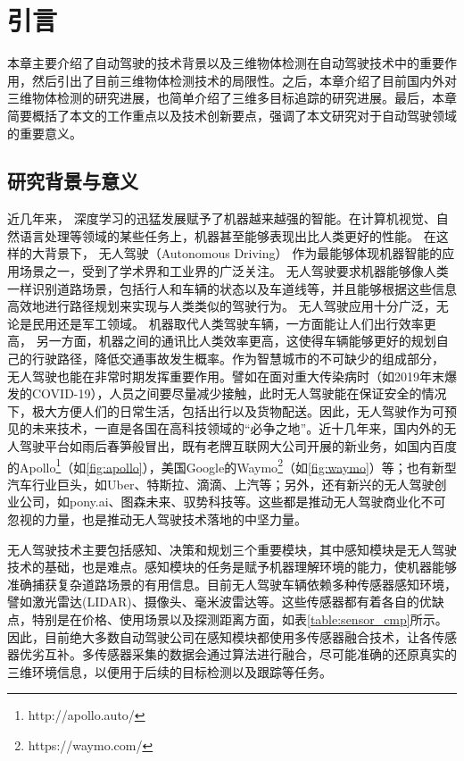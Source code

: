 \chapter{引言}
\label{ch:intro}
本章主要介绍了自动驾驶的技术背景以及三维物体检测在自动驾驶技术中的重要作用，然后引出了目前三维物体检测技术的局限性。之后，本章介绍了目前国内外对三维物体检测的研究进展，也简单介绍了三维多目标追踪的研究进展。最后，本章简要概括了本文的工作重点以及技术创新要点，强调了本文研究对于自动驾驶领域的重要意义。

\section{研究背景与意义}
\label{sec:background}
近几年来， 深度学习的迅猛发展赋予了机器越来越强的智能。在计算机视觉、自然语言处理等领域的某些任务上，机器甚至能够表现出比人类更好的性能\cite{he2016deep,DevlinBERT}。 在这样的大背景下， 无人驾驶（Autonomous Driving） 作为最能够体现机器智能的应用场景之一，受到了学术界和工业界的广泛关注。 无人驾驶要求机器能够像人类一样识别道路场景，包括行人和车辆的状态以及车道线等，并且能够根据这些信息高效地进行路径规划来实现与人类类似的驾驶行为。 无人驾驶应用十分广泛，无论是民用还是军工领域。 机器取代人类驾驶车辆，一方面能让人们出行效率更高， 另一方面，机器之间的通讯比人类效率更高，这使得车辆能够更好的规划自己的行驶路径，降低交通事故发生概率。作为智慧城市的不可缺少的组成部分， 无人驾驶也能在非常时期发挥重要作用。譬如在面对重大传染病时（如2019年末爆发的COVID-19），人员之间要尽量减少接触，此时无人驾驶能在保证安全的情况下，极大方便人们的日常生活，包括出行以及货物配送。因此，无人驾驶作为可预见的未来技术，一直是各国在高科技领域的“必争之地”。近十几年来，国内外的无人驾驶平台如雨后春笋般冒出，既有老牌互联网大公司开展的新业务，如国内百度的Apollo\footnote[1]{http://apollo.auto/}（如\figurename \ref{fig:apollo}），美国Google的Waymo\footnote[2]{https://waymo.com/}（如\figurename \ref{fig:waymo}）等；也有新型汽车行业巨头，如Uber、特斯拉、滴滴、上汽等；另外，还有新兴的无人驾驶创业公司，如pony.ai、图森未来、驭势科技等。这些都是推动无人驾驶商业化不可忽视的力量，也是推动无人驾驶技术落地的中坚力量。



无人驾驶技术主要包括感知、决策和规划三个重要模块，其中感知模块是无人驾驶技术的基础，也是难点。感知模块的任务是赋予机器理解环境的能力，使机器能够准确捕获复杂道路场景的有用信息。目前无人驾驶车辆依赖多种传感器感知环境， 譬如激光雷达(LIDAR)、摄像头、毫米波雷达等。这些传感器都有着各自的优缺点，特别是在价格、使用场景以及探测距离方面，如表\ref{table:sensor_cmp}所示。因此，目前绝大多数自动驾驶公司在感知模块都使用多传感器融合技术，让各传感器优劣互补。多传感器采集的数据会通过算法进行融合，尽可能准确的还原真实的三维环境信息，以便用于后续的目标检测以及跟踪等任务。

